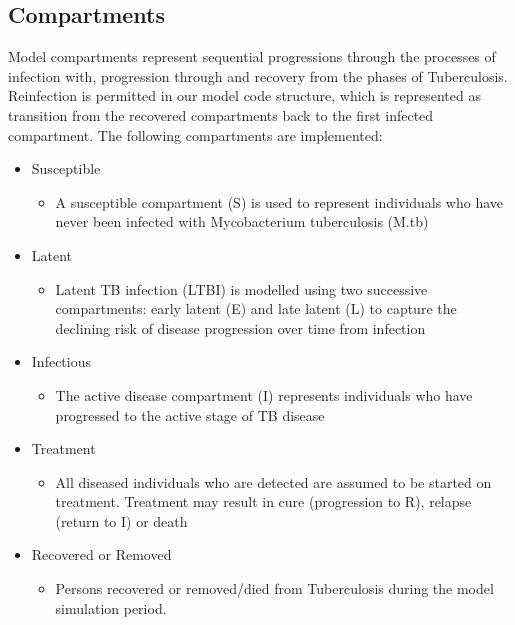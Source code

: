 \subsection{Compartments}
Model compartments represent sequential progressions through the processes of infection with, progression through and recovery from the phases of Tuberculosis.
Reinfection is permitted in our model code structure, which is represented as transition from the recovered compartments back to the first infected compartment.
The following compartments are implemented:
\begin{itemize}
    \item Susceptible
    \begin{itemize}
        \item A susceptible compartment (S) is used to represent individuals who have never been infected with Mycobacterium tuberculosis (M.tb)
    \end{itemize}
    \item Latent
    \begin{itemize}
        \item Latent TB infection (LTBI) is modelled using two successive compartments: early latent (E) and late latent (L) to capture the declining risk of disease progression over time from infection
    \end{itemize}
    \item Infectious
    \begin{itemize}
        \item The active disease compartment (I) represents individuals who have progressed to the active stage of TB disease
    \end{itemize}
    \item Treatment
    \begin{itemize}
        \item All diseased individuals who are detected are assumed to be started on treatment. Treatment may result in cure (progression to R), relapse (return to I) or death
    \end{itemize}
    \item Recovered or Removed
    \begin{itemize}
        \item Persons recovered or removed/died from Tuberculosis during the model simulation period.
    \end{itemize}
\end{itemize}
